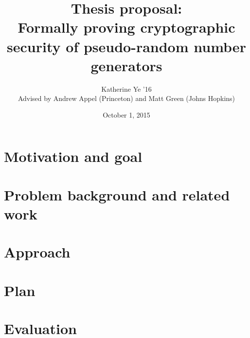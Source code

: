 \documentclass{article}
\title{Thesis proposal: \\ Formally proving cryptographic security of pseudo-random number generators }
\date{October 1, 2015}
\begin{document}
\author {Katherine Ye '16 \\ Advised by Andrew Appel (Princeton) and Matt Green (Johns Hopkins)}

\maketitle

\newcommand{\benum} {\begin{enumerate}}
\newcommand{\eenum} {\end{enumerate}}
\newcommand{\s} {\textrm{ }}
\newcommand{\f} {\frac}
\newcommand{\mb} {\mathbb}
\newcommand{\mc} {\mathcal}
\newcommand{\bld} {\textbf}
\newcommand{\limn} {\lim_{n \to \infty}}
\newcommand{\lt} {\left}
\newcommand{\rt} {\right}
\newcommand{\sm} {\setminus}
\newcommand{\pb} {\mathbf{P}}


\section{Motivation and goal}


\section{Problem background and related work}


\section{Approach}


\section{Plan}


\section{Evaluation}
\end{document}
